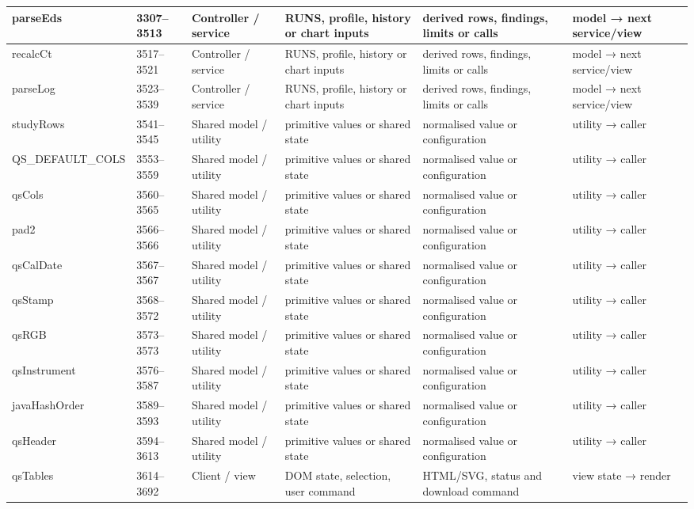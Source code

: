 \begin{landscape}
\begin{longtable}{@{}p{3.2cm}p{1.45cm}p{2.7cm}p{4.0cm}p{4.0cm}p{3.0cm}@{}}
parseEds & 3307--3513 & Controller / service & RUNS, profile, history or chart inputs & derived rows, findings, limits or calls & model → next service/view \\\hline
recalcCt & 3517--3521 & Controller / service & RUNS, profile, history or chart inputs & derived rows, findings, limits or calls & model → next service/view \\\hline
parseLog & 3523--3539 & Controller / service & RUNS, profile, history or chart inputs & derived rows, findings, limits or calls & model → next service/view \\\hline
studyRows & 3541--3545 & Shared model / utility & primitive values or shared state & normalised value or configuration & utility → caller \\\hline
QS\_DEFAULT\_COLS & 3553--3559 & Shared model / utility & primitive values or shared state & normalised value or configuration & utility → caller \\\hline
qsCols & 3560--3565 & Shared model / utility & primitive values or shared state & normalised value or configuration & utility → caller \\\hline
pad2 & 3566--3566 & Shared model / utility & primitive values or shared state & normalised value or configuration & utility → caller \\\hline
qsCalDate & 3567--3567 & Shared model / utility & primitive values or shared state & normalised value or configuration & utility → caller \\\hline
qsStamp & 3568--3572 & Shared model / utility & primitive values or shared state & normalised value or configuration & utility → caller \\\hline
qsRGB & 3573--3573 & Shared model / utility & primitive values or shared state & normalised value or configuration & utility → caller \\\hline
qsInstrument & 3576--3587 & Shared model / utility & primitive values or shared state & normalised value or configuration & utility → caller \\\hline
javaHashOrder & 3589--3593 & Shared model / utility & primitive values or shared state & normalised value or configuration & utility → caller \\\hline
qsHeader & 3594--3613 & Shared model / utility & primitive values or shared state & normalised value or configuration & utility → caller \\\hline
qsTables & 3614--3692 & Client / view & DOM state, selection, user command & HTML/SVG, status and download command & view state → render \\\hline

\end{longtable}
\end{landscape}
